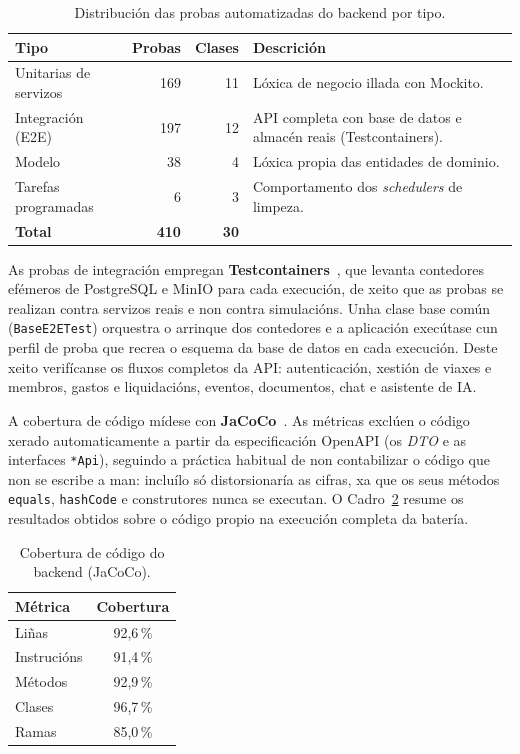 \begin{table}[H]
  \caption{Distribución das probas automatizadas do backend por tipo.}
  \label{tab:probas}
  \centering
  \begin{tabular}{@{}lrrp{6.5cm}@{}}
    \toprule
    \textbf{Tipo} & \textbf{Probas} & \textbf{Clases} & \textbf{Descrición} \\
    \midrule
    Unitarias de servizos   & 169 & 11 & Lóxica de negocio illada con Mockito. \\
    Integración (E2E)        & 197 & 12 & API completa con base de datos e almacén reais (Testcontainers). \\
    Modelo                   &  38 &  4 & Lóxica propia das entidades de dominio. \\
    Tarefas programadas      &   6 &  3 & Comportamento dos \textit{schedulers} de limpeza. \\
    \midrule
    \textbf{Total}           & \textbf{410} & \textbf{30} & \\
    \bottomrule
  \end{tabular}
\end{table}

As probas de integración empregan \textbf{Testcontainers}~\cite{testcontainers}, que levanta
contedores efémeros de PostgreSQL e MinIO para cada execución, de xeito que as probas se
realizan contra servizos reais e non contra simulacións. Unha clase base común
(\texttt{BaseE2ETest}) orquestra o arrinque dos contedores e a aplicación execútase cun
perfil de proba que recrea o esquema da base de datos en cada execución. Deste xeito
verifícanse os fluxos completos da API: autenticación, xestión de viaxes e membros, gastos
e liquidacións, eventos, documentos, chat e asistente de IA.

A cobertura de código mídese con \textbf{JaCoCo}~\cite{jacoco}. As métricas exclúen o
código xerado automaticamente a partir da especificación OpenAPI (os \textit{DTO} e as
interfaces \texttt{*Api}), seguindo a práctica habitual de non contabilizar o código que
non se escribe a man: incluílo só distorsionaría as cifras, xa que os seus métodos
\texttt{equals}, \texttt{hashCode} e construtores nunca se executan. O
Cadro~\ref{tab:cobertura} resume os resultados obtidos sobre o código propio na execución
completa da batería.

\begin{table}[H]
  \caption{Cobertura de código do backend (JaCoCo).}
  \label{tab:cobertura}
  \centering
  \begin{tabularx}{\textwidth}{@{}Xc@{}}
    \toprule
    \textbf{Métrica} & \textbf{Cobertura} \\
    \midrule
    Liñas       & 92,6\,\% \\
    Instrucións & 91,4\,\% \\
    Métodos     & 92,9\,\% \\
    Clases      & 96,7\,\% \\
    Ramas       & 85,0\,\% \\
    \bottomrule
  \end{tabularx}
\end{table}


